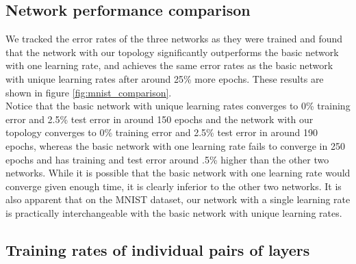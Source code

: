 \documentclass[format=sigconf]{acmart}
\newcommand{\npar}{\\\indent}
\begin{document}
\subsection{Network performance comparison}
\label{sec:network_performance}

We tracked the error rates of the three networks as they were trained and found that the network with our topology significantly outperforms the basic network with one learning rate, and achieves the same error rates as the basic network with unique learning rates after around 25\% more epochs. These results are shown in figure \ref{fig:mnist_comparison}.
\npar
 Notice that the basic network with unique learning rates converges to 0\% training error and 2.5\% test error in around 150 epochs and the network with our topology converges to 0\% training error and 2.5\% test error in around 190 epochs, whereas the basic network with one learning rate fails to converge in 250 epochs and has training and test error around .5\% higher than the other two networks. While it is possible that the basic network with one learning rate would converge given enough time, it is clearly inferior to the other two networks. It is also apparent that on the MNIST dataset, our network with a single learning rate is practically interchangeable with the basic network with unique learning rates.

\subsection{Training rates of individual pairs of layers}
\label{sec:mnist_perlayer}
\end{document}
